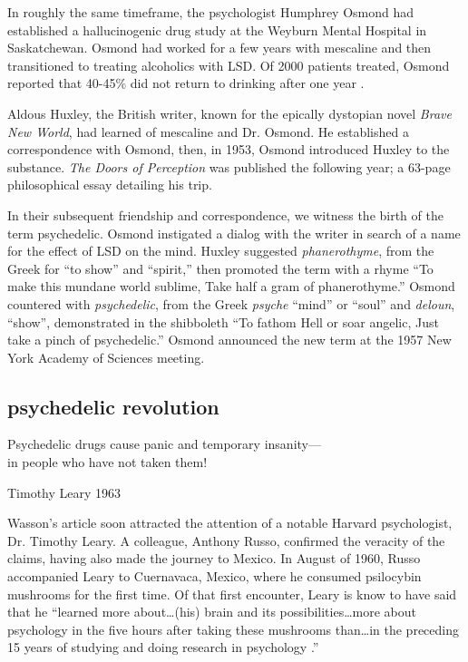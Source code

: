 \documentclass{UIdahoMastersThesis}
\begin{document}
In roughly the same timeframe, the psychologist Humphrey Osmond had established a hallucinogenic drug study at the Weyburn Mental Hospital in Saskatchewan. Osmond had worked for a few years with mescaline and then transitioned to treating alcoholics with LSD. Of 2000 patients treated, Osmond reported that 40-45\% did not return to drinking after one year \cite{dyck_hitting_2006}.

Aldous Huxley, the British writer, known for the epically dystopian novel \emph{Brave New World}, had learned of mescaline and Dr. Osmond. He established a correspondence with Osmond, then, in 1953, Osmond introduced Huxley to the substance. \emph{The Doors of Perception} was published the following year; a 63-page philosophical essay detailing his trip.

In their subsequent friendship and correspondence, we witness the birth of the term psychedelic. Osmond instigated a dialog with the writer in search of a name for the effect of LSD on the mind. Huxley suggested \emph{phanerothyme}, from the Greek for ``to show'' and ``spirit,'' then promoted the term with a rhyme \enquote{To make this mundane world sublime, Take half a gram of phanerothyme.} Osmond countered with \emph{psychedelic}, from the Greek \emph{psyche} ``mind'' or ``soul'' and \emph{deloun}, ``show'', demonstrated in the shibboleth \enquote{To fathom Hell or soar angelic, Just take a pinch of psychedelic.} Osmond announced the new term at the 1957 New York Academy of Sciences meeting. 


\subsection{psychedelic revolution}

\epigraph {Psychedelic drugs cause panic and temporary insanity---\\
in people who have not taken them!}{Timothy Leary 1963}

\vspace{9mm}

Wasson's article soon attracted the attention of a notable Harvard psychologist, Dr. Timothy Leary. A colleague, Anthony Russo, confirmed the veracity of the claims, having also made the journey to Mexico. In August of 1960, Russo accompanied Leary to Cuernavaca, Mexico, where he consumed psilocybin mushrooms for the first time. Of that first encounter, Leary is know to have said that he \enquote{learned more about\ldots (his) brain and its possibilities\ldots more about psychology in the five hours after taking these mushrooms than\ldots in the preceding 15 years of studying and doing research in psychology \cite{dassfierce}.} 
\end{document}

